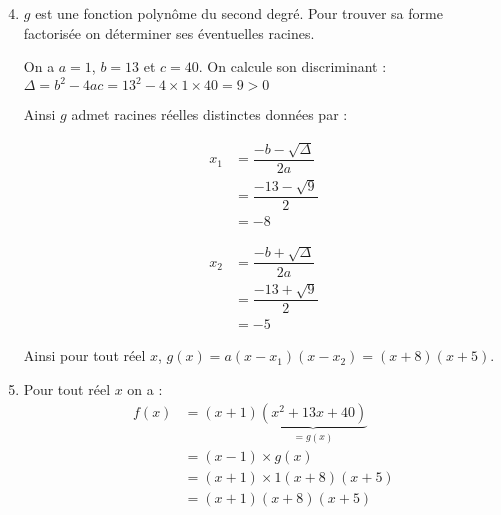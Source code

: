 \documentclass[15pt, mathserif]{beamer}
\begin{document}
 \begin{frame} 
 \begin{enumerate} 
 \setcounter{enumi}{3} 
 	\item $g$ est une fonction polynôme du second degré. Pour trouver sa forme factorisée on déterminer ses éventuelles racines.
 
 On a $a=1$, $b=13$ et $c=40$. On calcule son discriminant : \hfil $\Delta=b^2-4ac= 13^2 -4 \times 1 \times 40= 9 >0$ 
 
 Ainsi $g$ admet racines réelles distinctes données par : \begin{minipage}{0.45\linewidth} 
 \begin{align*} 
 x_1 &= \dfrac{-b-\sqrt{\Delta}}{2a} \\ 
 &= \dfrac{-13-\sqrt{9}}{2} \\ 
 &= -8\end{align*} 
 \end{minipage} 
 \hfil \begin{minipage}{0.45\linewidth} 
 \begin{align*}x_2 &= \dfrac{-b+\sqrt{\Delta}}{2a} \\ 
 &= \dfrac{-13+\sqrt{9}}{2} \\ 
 &= -5
 \end{align*} 
 \end{minipage} 
 
 Ainsi pour tout réel $x$, $g(x)=a(x-x_1)(x-x_2)= \left(x+8\right)\left(x+5 \right)$. 
 \end{enumerate}
 \end{frame} 
 \begin{frame} 
 \begin{enumerate} 
 \setcounter{enumi}{4} 
 	 \item Pour tout réel $x$ on a :
 \begin{align*} 
 f(x)&=(x+1)\underbrace{(x^2+13x+40)}_{=g(x)} \\ 
   &= (x-1) \times g(x) \\ 
  &= (x+1) \times 1\left(x+8\right)\left(x+5 \right) \\ 
 &= (x+1)\left(x+8\right)\left(x+5 \right)
   \end{align*}
 \end{enumerate} 
 
 \end{frame}
\end{document}
